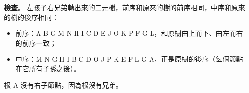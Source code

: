 \begin{pastsoln}
\textbf{檢查}。 左孩子右兄弟轉出來的二元樹，前序和原來的樹的前序相同，中序和原來的樹的後序相同：
\begin{itemize}
\item 前序：A B G M N H I C D E J O K P F G L，和原樹由上而下、由左而右的前序一致；
\item 中序：M N G H I B C D O J P K E F L G A，正是原樹的後序（每個節點在它所有子孫之後）。
\end{itemize}
根 A 沒有右子節點，因為根沒有兄弟。
\end{pastsoln}
